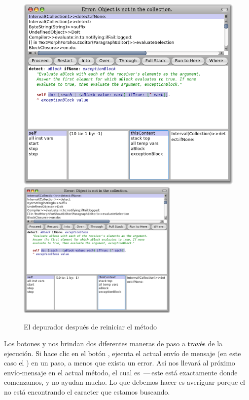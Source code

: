 \documentclass[spanish,a4paper,10pt,twoside]{book}
\begin{document}
\begin{figure}[btp]
	\begin{center}
	\ifluluelse
		{\includegraphics[width=\textwidth]{RestartDetectIfNone}}
		{\includegraphics[width=0.7\textwidth]{RestartDetectIfNone}}
	\end{center}
	\caption{El depurador despu\'es de reiniciar el m\'etodo  }
\end{figure}

Los botones  y  nos brindan dos diferentes maneras de
paso a trav\'es de la ejecuci\'on.  Si hace clic en el bot\'on ,
\pharo ejecuta el actual env\'io de mensaje (en este caso el ) en un
paso, a menos que exista un error. As\'i  nos llevar\'a al pr\'oximo env\'io-mensaje en el actual m\'etodo, el cual es \,---\,este est\'a exactamente donde comenzamos, y no ayudan mucho. Lo que debemos hacer es averiguar porque el  no est\'a encontrando el caracter que estamos buscando.
\end{document}
